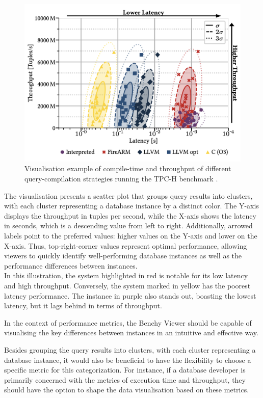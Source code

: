 \begin{figure}[h]
  \centering
  \includegraphics[width=0.8\linewidth]{figures/risc-metrcis-visualisation.png}
  \caption{Visualisation example of compile-time and throughput of different query-compilation strategies running the TPC-H benchmark \cite{Bringin-Compiling-Databases-to-RISC}.}
  \label{fig:risc-metrics}
\end{figure}

\noindent

The visualisation presents a scatter plot that groups query results into clusters, with each cluster representing a database instance by a distinct color. The Y-axis displays the throughput in tuples per second, while the X-axis shows the latency in seconds, which is a descending value from left to right. Additionally, arrowed labels point to the preferred values: higher values on the Y-axis and lower on the X-axis. Thus, top-right-corner values represent optimal performance, allowing viewers to quickly identify well-performing database instances as well as the performance differences between instances.\\
In this illustration, the system highlighted in red is notable for its low latency and high throughput. Conversely, the system marked in yellow has the poorest latency performance. The instance in purple also stands out, boasting the lowest latency, but it lags behind in terms of throughput.

In the context of performance metrics, the Benchy Viewer should be capable of visualising the key differences between instances in an intuitive and effective way. 

Besides grouping the query results into clusters, with each cluster representing a database instance, it would also be beneficial to have the flexibility to choose a specific metric for this categorization. For instance, if a database developer is primarily concerned with the metrics of execution time and throughput, they should have the option to shape the data visualisation based on these metrics.

